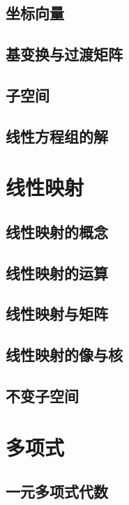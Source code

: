 \documentclass[UTF8,12pt,a4paper,fontset=fandol]{ctexbook}
\begin{document}
\section{坐标向量}

\section{基变换与过渡矩阵}

\section{子空间}

\section{线性方程组的解}


\chapter{线性映射}

\section{线性映射的概念}

\section{线性映射的运算}

\section{线性映射与矩阵}

\section{线性映射的像与核}

\section{不变子空间}


\chapter{多项式}

\section{一元多项式代数}
\end{document}
